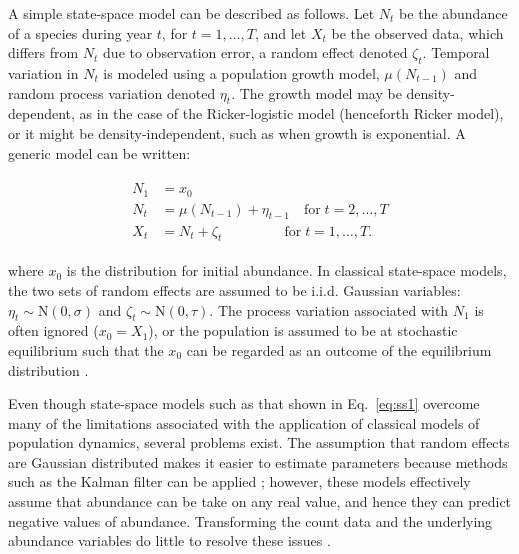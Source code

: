 \documentclass[12pt,english]{article}
\begin{document}
\begin{spacing}{1.9}
\begin{flushleft}
A simple state-space model can be described as follows.
Let $N_t$ be the abundance of a species during year $t$, for
$t=1,\hdots,T$, and let $X_t$ be
the observed data, which differs from $N_t$ due to observation error,
a random effect denoted $\zeta_t$. Temporal variation in $N_t$ is
modeled using a population growth model, $\mu(N_{t-1})$
and random process variation denoted $\eta_t$.
The growth model may be density-dependent, as in the case of the 
Ricker-logistic model (henceforth Ricker model), or it might be 
density-independent, such as when growth
is exponential. 
A generic model can be written: 
\begin{linenomath*}
\begin{gather}
  \label{eq:ss1}
  \begin{align}
    N_1 &= x_0 \nonumber \\ 
N_t &= \mu(N_{t-1}) + \eta_{t-1} \quad \text{for} \; 
t=2,\hdots,T  \\
X_t &= N_t + \zeta_t \qquad \qquad \;\, \text{for} \;
t=1,\hdots,T. \nonumber 
  \end{align}
\end{gather}
\end{linenomath*}
where $x_0$ is the distribution for initial abundance.  In classical
state-space models, the two sets of random effects
are assumed to be i.i.d. Gaussian variables: 
$\eta_t \sim \mathrm{N}(0, \sigma)$ and
$\zeta_t \sim \mathrm{N}(0, \tau)$. 
The process variation associated with $N_1$ is often ignored ($x_0 = X_1$), or
the population is assumed to be at stochastic equilibrium such that the $x_0$ can
be regarded as an outcome of the equilibrium distribution \citep{devalpine_hastings:2002}.

Even though state-space models such as that shown in Eq.~\ref{eq:ss1}
overcome many of the limitations associated with the application of
classical models of population dynamics, 
several problems exist. 
The assumption that random effects are Gaussian distributed makes it
easier to estimate parameters because methods such as the Kalman
filter can be applied 
\citep{dennis_etal:2006}; however, 
these models effectively assume that abundance can be take on any
real value, and hence they can predict negative values of abundance. 
Transforming the count data and the underlying abundance variables 
do little to resolve these issues \citep{ohara_kotze:2010}.


\end{flushleft}
\end{spacing}
\end{document}
